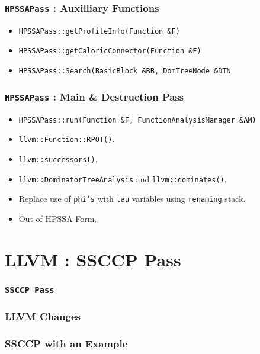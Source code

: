 \documentclass{beamer}
\begin{document}
\begin{frame}
	\frametitle{\texttt{HPSSAPass} : Auxilliary Functions}
	\begin{itemize}
		\item \texttt{HPSSAPass::getProfileInfo(Function \&F)}
		\item \texttt{HPSSAPass::getCaloricConnector(Function \&F)}
		\item \texttt{HPSSAPass::Search(BasicBlock \&BB, DomTreeNode \&DTN} 
	\end{itemize}
\end{frame}

\begin{frame}
	\frametitle{\texttt{HPSSAPass} : Main \& Destruction Pass}
	\begin{itemize}
		\item \texttt{HPSSAPass::run(Function \&F, FunctionAnalysisManager \&AM)} 
		\item \texttt{llvm::Function::RPOT()}.
		\item \texttt{llvm::successors()}.
		\item \texttt{llvm::DominatorTreeAnalysis} and \texttt{llvm::dominates()}.
		\item Replace use of \texttt{phi's} with \texttt{tau} variables using \texttt{renaming} stack.
		\item Out of HPSSA Form. 
	\end{itemize}
\end{frame}

\section{LLVM : SSCCP Pass}

\begin{frame}
	\frametitle{\texttt{SSCCP Pass}}

\end{frame}

\begin{frame}
	\frametitle{LLVM Changes}

\end{frame}


\begin{frame}
	\frametitle{SSCCP with an Example}
	
\end{frame}
\end{document}
